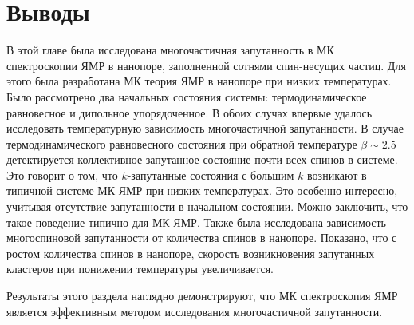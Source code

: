 \section{Выводы}
\label{sec:conslusions}

В этой главе была исследована многочастичная запутанность в МК спектроскопии ЯМР в нанопоре, заполненной сотнями спин-несущих частиц.
Для этого была разработана МК теория ЯМР в нанопоре при низких температурах.
Было рассмотрено два начальных состояния системы:
термодинамическое равновесное
и дипольное упорядоченное.
В обоих случах впервые удалось исследовать температурную зависимость многочастичной запутанности.
В случае термодинамического равновесного состояния при обратной температуре $\beta \sim 2.5$ детектируется коллективное запутанное состояние почти всех спинов в системе.
Это говорит о том, что $k$-запутанные состояния с большим $k$ возникают в типичной системе МК ЯМР при низких температурах.
Это особенно интересно, учитывая отсутствие запутанности в начальном состоянии.
Можно заключить, что такое поведение типично для МК ЯМР.
Также была исследована зависимость многоспиновой запутанности
от количества спинов в нанопоре.
Показано, что с ростом количества спинов в нанопоре,
скорость возникновения запутанных кластеров при понижении температуры увеличивается.

Результаты этого раздела наглядно демонстрируют,
что МК спектроскопия ЯМР является эффективным методом исследования многочастичной запутанности.
